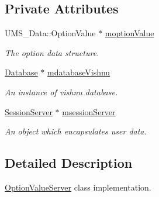 \subsection*{Private Attributes}
\begin{DoxyCompactItemize}
\item 
\hypertarget{classOptionValueServer_afffe0327c43751ff0daa1b53b94be62f}{
UMS\_\-Data::OptionValue $\ast$ \hyperlink{classOptionValueServer_afffe0327c43751ff0daa1b53b94be62f}{moptionValue}}
\label{classOptionValueServer_afffe0327c43751ff0daa1b53b94be62f}

\begin{DoxyCompactList}\small\item\em The option data structure. \item\end{DoxyCompactList}\item 
\hypertarget{classOptionValueServer_a815114e58f01214f1b09c8d55bab5a53}{
\hyperlink{classDatabase}{Database} $\ast$ \hyperlink{classOptionValueServer_a815114e58f01214f1b09c8d55bab5a53}{mdatabaseVishnu}}
\label{classOptionValueServer_a815114e58f01214f1b09c8d55bab5a53}

\begin{DoxyCompactList}\small\item\em An instance of vishnu database. \item\end{DoxyCompactList}\item 
\hypertarget{classOptionValueServer_a7b01e99f3d94398360efeebec599f287}{
\hyperlink{classSessionServer}{SessionServer} $\ast$ \hyperlink{classOptionValueServer_a7b01e99f3d94398360efeebec599f287}{msessionServer}}
\label{classOptionValueServer_a7b01e99f3d94398360efeebec599f287}

\begin{DoxyCompactList}\small\item\em An object which encapsulates user data. \item\end{DoxyCompactList}\end{DoxyCompactItemize}


\subsection{Detailed Description}
\hyperlink{classOptionValueServer}{OptionValueServer} class implementation. 

